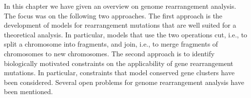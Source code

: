 \documentclass{svmult}
\begin{document}
In this chapter we have given an overview on genome rearrangement analysis. The focus was on the following two approaches. 
The first approach is the development of models for rearrangement mutations that are well suited for a theoretical analysis. 
In particular, models that use the two operations cut, i.e., to split a chromosome into fragments, and join, i.e., to merge 
fragments of chromosomes to new chromosomes. The second approach is to identify biologically motivated constraints on the 
applicability of gene rearrangement mutations. In particular, constraints that model conserved gene clusters have been 
considered. Several open problems for genome rearrangement analysis have been mentioned.


%
%



 
\end{document}
